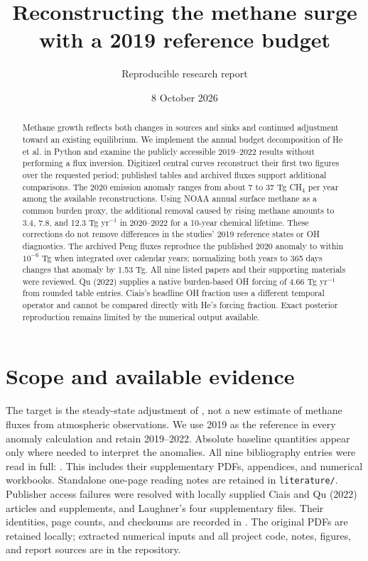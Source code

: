 \documentclass[11pt]{article}
\title{Reconstructing the methane surge with a 2019 reference budget}
\author{Reproducible research report}
\date{8 October 2026}
\begin{document}
\maketitle
\begin{abstract}
Methane growth reflects both changes in sources and sinks and continued
adjustment toward an existing equilibrium. We implement the annual budget
decomposition of He et al. in Python and examine the publicly accessible
2019--2022 results without performing a flux inversion. Digitized central
curves reconstruct their first two figures over the requested period;
published tables and archived fluxes support additional comparisons. The
2020 emission anomaly ranges from about 7 to 37 Tg CH$_4$ per year among the
available reconstructions. Using NOAA annual surface methane as a common
burden proxy, the additional removal caused by rising methane amounts to
3.4, 7.8, and 12.3 Tg yr$^{-1}$ in 2020--2022 for a 10-year chemical lifetime.
These corrections do not remove differences in the studies' 2019 reference
states or OH diagnostics. The archived Peng fluxes reproduce the published
2020 anomaly to within $10^{-6}$ Tg when integrated over calendar years;
normalizing both years to 365 days changes that anomaly by 1.53 Tg.
All nine listed papers and their supporting materials were reviewed. Qu
(2022) supplies a native burden-based OH forcing of 4.66 Tg yr$^{-1}$ from
rounded table entries. Ciais's headline OH fraction uses a different temporal
operator and cannot be compared directly with He's forcing fraction.
Exact posterior reproduction remains limited by the numerical output available.
\end{abstract}

\section{Scope and available evidence}
The target is the steady-state adjustment of \citet{heetal2026a}, not a new
estimate of methane fluxes from atmospheric observations. We use 2019 as the
reference in every anomaly calculation and retain 2019--2022. Absolute
baseline quantities appear only where needed to interpret the anomalies.
All nine bibliography entries were read in full: \citet{heetal2026a,
ciaisetal2026,fengetal2023,laughneretal2021,pengetal2022,quetal2022,
quetal2024,stevensonetal2022,lawrenceetal2001}. This includes their
supplementary PDFs, appendices, and numerical workbooks. Standalone one-page
reading notes are retained in \texttt{literature/}. Publisher access failures
were resolved with locally supplied Ciais and Qu (2022) articles and
supplements, and Laughner's four supplementary files. Their identities,
page counts, and checksums are recorded in .
The original PDFs are retained locally; extracted numerical inputs and all
project code, notes, figures, and report sources are in the repository.
\end{document}
